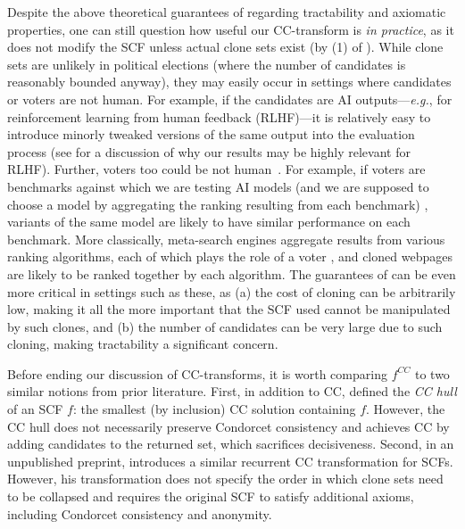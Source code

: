 Despite the above theoretical guarantees of  regarding tractability and axiomatic properties, one can still question how useful our CC-transform is \emph{in practice}, as it does not modify the SCF unless actual clone sets exist (by (1) of ). While clone sets are unlikely in political elections (where the number of candidates is reasonably bounded anyway), they may easily occur in settings where candidates or voters are not human. For example, if the candidates are AI outputs---\emph{e.g.}, for reinforcement learning from human feedback (RLHF)---it is relatively easy to introduce minorly tweaked versions of the same output into the evaluation process (see  for a discussion of why our results may be highly relevant for RLHF). Further, voters too could be not human~\citep{Xu24:Aggregating}. For example, if voters are benchmarks against which we are testing AI models (and we are supposed to choose a model by aggregating the ranking resulting from each benchmark) \citep{Lanctot25:Evaluating}, variants of the same model are likely to have similar performance on each benchmark. More classically, meta-search engines aggregate results from various ranking algorithms, each of which plays the role of a voter \citep{Dwork01:Rank}, and cloned webpages are likely to be ranked together by each algorithm. The guarantees of  can be even more critical in settings such as these, as (a) the cost of cloning can be arbitrarily low, making it all the more important that the SCF used cannot be manipulated by such clones, and (b) the number of candidates can be very large due to such cloning, making tractability a significant concern.

Before ending our discussion of CC-transforms, it is worth comparing $f^{CC}$ to two similar notions from prior literature. First, in addition to CC, \citet{Laffond96:Composition} defined the \textit{CC hull} of an SCF $f$: the smallest (by inclusion) CC solution containing $f$. However, the CC hull does not necessarily preserve Condorcet consistency and achieves CC by adding candidates to the returned set, which sacrifices decisiveness. Second, in an unpublished preprint, \citet{Heitzig02:Social} introduces a similar recurrent CC transformation for SCFs. However, his transformation does not specify the order in which clone sets need to be collapsed and requires the original SCF to satisfy additional axioms, including Condorcet consistency and anonymity.

